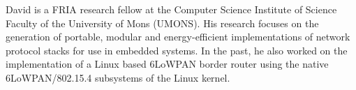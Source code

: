 David is a FRIA research fellow at the Computer Science
Institute of Science Faculty of the University of Mons
(UMONS). His research focuses on the generation of portable,
modular and energy-efficient implementations of network
protocol stacks for use in embedded systems. In the past, he
also worked on the implementation of a Linux based 6LoWPAN
border router using the native 6LoWPAN/802.15.4 subsystems
of the Linux kernel.
